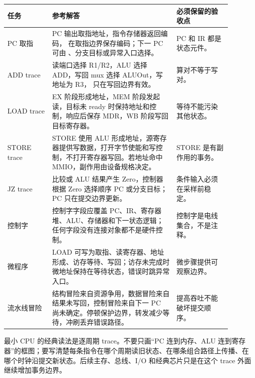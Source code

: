 \begin{longtable}{L{0.18\linewidth}L{0.5\linewidth}L{0.22\linewidth}}
\toprule
任务 & 参考解答 & 必须保留的验收点 \\
\midrule
PC 取指 & PC 输出取指地址，指令存储器返回编码， 在取指边界保存编码；下一 PC 可由 、分支目标或异常入口选择。 & PC 和 IR 都是状态元件。 \\
ADD trace & 读端口选择 R1/R2，ALU 选择 ADD，写回 mux 选择 ALUOut，写地址为 R3， 只在写回边界有效。 & 算对不等于写对。 \\
LOAD trace & EX 阶段形成地址，MEM 阶段发起读，目标未 ready 时保持地址和控制，响应后保存 MDR，WB 阶段写回目标寄存器。 & 等待不能污染其他状态。 \\
STORE trace & STORE 使用 ALU 形成地址，源寄存器提供写数据，打开字节使能和写控制，不打开寄存器写回。若地址命中 MMIO，副作用由设备规格决定。 & STORE 是有副作用的事务。 \\
JZ trace & 比较或 ALU 结果产生 Zero，控制器根据 Zero 选择顺序 PC 或分支目标；PC 只在提交边界更新。 & 条件输入必须在采样前稳定。 \\
控制字 & 控制字字段应覆盖 PC、IR、寄存器堆、ALU、存储器和下一状态逻辑；任何字段没有连接对象都不是硬件控制。 & 控制字是电线集合，不是注释。 \\
微程序 & LOAD 可写为取指、读寄存器、地址形成、访存等待、写回；访存未完成时微地址保持在等待状态，错误时跳异常入口。 & 微步骤提供可观察边界。 \\
流水线冒险 & 结构冒险来自资源争用，数据冒险来自结果未写回，控制冒险来自下一 PC 尚未确定。停顿保护边界，转发减少等待，冲刷丢弃错误路径。 & 提高吞吐不能破坏提交顺序。 \\
\bottomrule
\end{longtable}

\begin{classicnote}
最小 CPU 的经典读法是逐周期 trace。不要只画“PC 连到内存、ALU 连到寄存器”的框图；要写清楚每条指令在哪个周期读旧状态、在哪条组合路径上传播、在哪个时钟沿提交新状态。后续主存、总线、I/O 和经典芯片只是在这个 trace 外面继续增加事务边界。
\end{classicnote}
